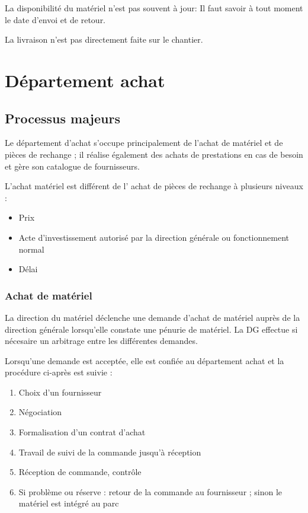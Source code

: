\documentclass[twoside]{article}
\begin{document}
    La disponibilité du matériel n'est pas souvent à jour: Il faut savoir à
    tout moment le date d'envoi et de retour.

    La livraison n'est pas directement faite sur le chantier.

\vfil
\pagebreak



\section{Département achat}

\subsection{Processus majeurs}

Le département d'achat s'occupe principalement de l'achat de matériel et de
pièces de rechange ; il réalise également des achats de prestations en cas
de besoin et gère son catalogue de fournisseurs.

L'achat matériel est différent de l' achat de pièces de rechange à plusieurs niveaux :
\begin{itemize}
\item Prix
\item Acte d'investissement autorisé par la direction générale ou fonctionnement normal
\item Délai
\end{itemize}


\subsubsection{Achat de matériel}

La direction du matériel déclenche une demande d'achat de matériel auprès
de la direction générale lorsqu'elle constate une pénurie de matériel. La
DG effectue si nécesaire un arbitrage entre les différentes demandes.

Lorsqu'une demande est acceptée, elle est confiée au département achat et
la procédure ci-après est suivie :

\begin{enumerate}
\item Choix d'un fournisseur
\item Négociation
\item Formalisation d'un contrat d'achat
\item Travail de suivi de la commande jusqu'à réception
\item Réception de commande, contrôle
\item Si problème ou réserve : retour de la commande au fournisseur ; sinon
        le matériel est intégré au parc
\end{enumerate}
\end{document}
